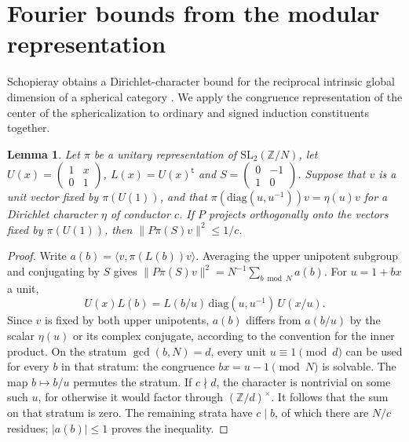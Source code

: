 \documentclass[11pt,a4paper]{article}
\newtheorem{lemma}[theorem]{Lemma}
\numberwithin{equation}{section}
\begin{document}
\section{Fourier bounds from the modular representation}\label{sec:hecke}
Schopieray obtains a Dirichlet-character bound for the reciprocal intrinsic global dimension of a spherical category \cite{SchopierayBlock}. We apply the congruence representation of the center of the sphericalization to ordinary and signed induction constituents together.
\begin{lemma}\label{lem:hecke-projection}
Let $\pi$ be a unitary representation of $\mathrm{SL}_2(\mathbb Z/N)$,
let $U(x)=\left(\begin{smallmatrix}1&x\\0&1\end{smallmatrix}\right)$,
$L(x)=U(x)^{\mathsf t}$ and
$S=\left(\begin{smallmatrix}0&-1\\1&0\end{smallmatrix}\right)$.
Suppose that $v$ is a unit vector fixed by $\pi(U(1))$, and that
$\pi(\mathrm{diag}(u,u^{-1}))v=\eta(u)v$ for a Dirichlet character
$\eta$ of conductor $c$. If $P$ projects orthogonally onto the vectors
fixed by $\pi(U(1))$, then $\|P\pi(S)v\|^2\le 1/c$.
\end{lemma}
\begin{proof}
Write $a(b)=\langle v,\pi(L(b))v\rangle$. Averaging the upper unipotent
subgroup and conjugating by $S$ gives
$\|P\pi(S)v\|^2=N^{-1}\sum_{b\bmod N}a(b)$. For $u=1+bx$ a unit,
\[
 U(x)L(b)=L(b/u)\,\mathrm{diag}(u,u^{-1})\,U(x/u).
\]
Since $v$ is fixed by both upper unipotents, $a(b)$ differs from
$a(b/u)$ by the scalar $\eta(u)$ or its complex conjugate, according to
the convention for the inner product. On the stratum $\gcd(b,N)=d$,
every unit $u\equiv1\pmod d$ can be used for every $b$ in that stratum:
the congruence $bx=u-1\pmod N$ is solvable. The map $b\mapsto b/u$
permutes the stratum. If $c\nmid d$, the character is nontrivial on
some such $u$, for otherwise it would factor through $(\mathbb Z/d)^\times$.
It follows that the sum on that stratum is zero. The remaining strata
have $c\mid b$, of which there are $N/c$ residues; $|a(b)|\le1$ proves
the inequality.
\end{proof}
\end{document}
